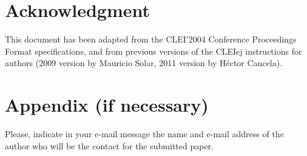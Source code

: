 \documentclass{cleiej}
\begin{document}
\section*{Acknowledgment}
This document has been adapted from the CLEI'2004 Conference Proceedings Format specifications, and from previous versions of the CLEIej instructions for authors (2009 version by Mauricio Solar, 2011 version by Héctor Cancela).  
 
%


\newpage
\section*{Appendix (if necessary)} 
Please, indicate in your e-mail message the name and e-mail address of the author who will be the contact for the submitted paper. 
\end{document}
